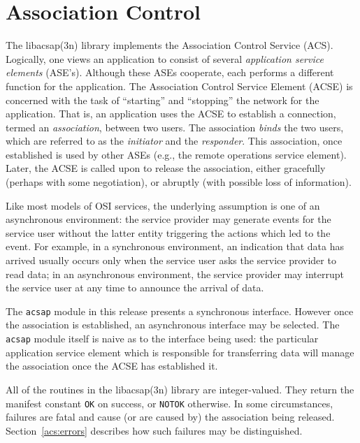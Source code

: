 
\chapter	{Association Control}\label{libacsap}
The \man libacsap(3n) library implements the Association Control Service
(ACS).
Logically,
one views an application to consist of several {\em application service
elements\/} (ASE's).
Although these ASEs cooperate,
each performs a different function for the application.
The Association Control Service Element (ACSE) is concerned with the task of
``starting'' and ``stopping'' the network for the application.
That is,
an application uses the ACSE to establish a connection,
termed an {\em association}, between two users.
The association {\em binds\/} the two users,
which are referred to as
the {\em initiator\/} and the {\em responder}.
This association, once established is used by other ASEs
(e.g., the remote operations service element).
Later,
the ACSE is called upon to release the association,
either gracefully (perhaps with some negotiation),
or abruptly (with possible loss of information).

Like most models of OSI services,
the underlying assumption is one of an asynchronous environment:
the service provider may generate events for the service user without the
latter entity triggering the actions which led to the event.
For example,
in a synchronous environment,
an indication that data has arrived usually occurs only when the service user
asks the service provider to read data;
in an asynchronous environment,
the service provider may interrupt the service user at any time to announce
the arrival of data.

The \verb"acsap" module in this release presents a synchronous interface.
However once the association is established,
an asynchronous interface may be selected.
The \verb"acsap" module itself is naive as to the interface being used:
the particular application service element which is responsible for
transferring data will manage the association once the ACSE has established it.

All of the routines in the \man libacsap(3n) library are integer-valued.
They return the manifest constant \verb"OK" on success,
or \verb"NOTOK" otherwise.
In some circumstances,
failures are fatal and cause (or are caused by) the association being released.
Section~\ref{acs:errors} describes how such failures may be distinguished.


